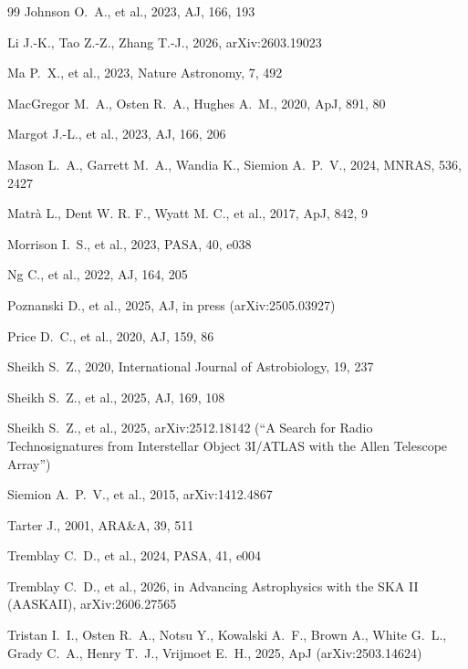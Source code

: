 \documentclass{openjournal}
\begin{document}
\begin{thebibliography}{99}
 Johnson O.~A., et al., 2023, AJ, 166, 193


 Li J.-K., Tao Z.-Z., Zhang T.-J., 2026, arXiv:2603.19023

 Ma P.~X., et al., 2023, Nature Astronomy, 7, 492

 MacGregor M.~A., Osten R.~A., Hughes A.~M., 2020, ApJ, 891, 80

 Margot J.-L., et al., 2023, AJ, 166, 206

 Mason L.~A., Garrett M.~A., Wandia K., Siemion A.~P.~V., 2024, MNRAS, 536, 2427

 Matrà L., Dent W. R. F., Wyatt M. C., et al., 2017, ApJ, 842, 9

 Morrison I.~S., et al., 2023, PASA, 40, e038

 Ng C., et al., 2022, AJ, 164, 205

 Poznanski D., et al., 2025, AJ, in press (arXiv:2505.03927)

 Price D.~C., et al., 2020, AJ, 159, 86

 Sheikh S.~Z., 2020, International Journal of Astrobiology, 19, 237

 Sheikh S.~Z., et al., 2025, AJ, 169, 108

 Sheikh S.~Z., et al., 2025, arXiv:2512.18142 (``A Search for Radio Technosignatures from Interstellar Object 3I/ATLAS with the Allen Telescope Array'')

 Siemion A.~P.~V., et al., 2015, arXiv:1412.4867

 Tarter J., 2001, ARA\&A, 39, 511

 Tremblay C.~D., et al., 2024, PASA, 41, e004

 Tremblay C.~D., et al., 2026, in Advancing Astrophysics with the SKA II (AASKAII), arXiv:2606.27565

 Tristan I.~I., Osten R.~A., Notsu Y., Kowalski A.~F., Brown A., White G.~L., Grady C.~A., Henry T.~J., Vrijmoet E.~H., 2025, ApJ (arXiv:2503.14624)


\end{thebibliography}
\end{document}
